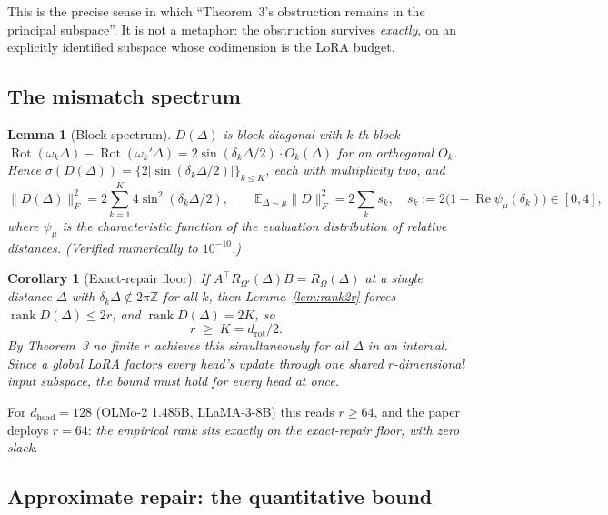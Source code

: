 \documentclass[11pt]{article}
\newtheorem{lemma}[theorem]{Lemma}
\newtheorem{corollary}[theorem]{Corollary}
\theoremstyle{definition}
\newcommand{\dhd}{d_{\mathrm{head}}}
\newcommand{\drot}{d_{\mathrm{rot}}}
\newcommand{\E}{\mathbb{E}}
\DeclareMathOperator{\rank}{rank}
\DeclareMathOperator{\Rot}{Rot}
\begin{document}
This is the precise sense in which ``Theorem~3's obstruction remains in the principal subspace''.
It is not a metaphor: the obstruction survives \emph{exactly}, on an explicitly identified subspace
whose codimension is the LoRA budget.

\subsection{The mismatch spectrum}

\begin{lemma}[Block spectrum]\label{lem:blockspec}
$D(\Delta)$ is block diagonal with $k$-th block $\Rot(\omega_k\Delta)-\Rot(\omega_k'\Delta)
=2\sin(\delta_k\Delta/2)\cdot O_k(\Delta)$ for an orthogonal $O_k$. Hence
$\sigma(D(\Delta))=\{2|\sin(\delta_k\Delta/2)|\}_{k\le K}$, each with multiplicity two, and
\begin{equation}
\|D(\Delta)\|_F^2=2\sum_{k=1}^K 4\sin^2(\delta_k\Delta/2),
\qquad
\E_{\Delta\sim\mu}\|D\|_F^2=2\sum_k s_k,\quad
s_k:=2\bigl(1-\operatorname{Re}\psi_\mu(\delta_k)\bigr)\in[0,4],
\label{eq:sk}
\end{equation}
where $\psi_\mu$ is the characteristic function of the evaluation distribution of relative
distances. (Verified numerically to $10^{-10}$.)
\end{lemma}

\begin{corollary}[Exact-repair floor]\label{cor:exactfloor}
If $A^\top R_{\Omega'}(\Delta)B=R_\Omega(\Delta)$ at a single distance $\Delta$ with
$\delta_k\Delta\notin2\pi\mathbb Z$ for all $k$, then Lemma~\ref{lem:rank2r} forces
$\rank D(\Delta)\le 2r$, and $\rank D(\Delta)=2K$, so
\begin{equation}
\boxed{\;r\;\ge\;K=\drot/2.\;}
\end{equation}
By Theorem~3 no finite $r$ achieves this simultaneously for all $\Delta$ in an interval.
Since a global LoRA factors every head's update through one shared $r$-dimensional input subspace,
the bound must hold for every head at once.
\end{corollary}

For $\dhd=128$ (OLMo-2 1.485B, LLaMA-3-8B) this reads $r\ge64$, and the paper deploys $r=64$:
\emph{the empirical rank sits exactly on the exact-repair floor, with zero slack.}

\subsection{Approximate repair: the quantitative bound}
\end{document}
